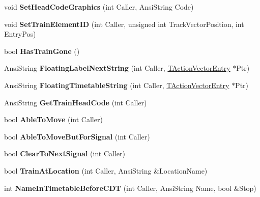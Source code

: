 \begin{DoxyCompactItemize}
void {\bfseries Set\+Head\+Code\+Graphics} (int Caller, Ansi\+String Code)
\item 
\mbox{\label{class_t_train_a0e0ab54415645b04cbdeadd829d27898}} 
void {\bfseries Set\+Train\+Element\+ID} (int Caller, unsigned int Track\+Vector\+Position, int Entry\+Pos)
\item 
\mbox{\label{class_t_train_af95a34f2334cb991841c24997d445ae3}} 
bool {\bfseries Has\+Train\+Gone} ()
\item 
\mbox{\label{class_t_train_a221da69cd80d206a06f840f4cd463cf9}} 
Ansi\+String {\bfseries Floating\+Label\+Next\+String} (int Caller, \mbox{\hyperlink{class_t_action_vector_entry}{T\+Action\+Vector\+Entry}} $\ast$Ptr)
\item 
\mbox{\label{class_t_train_a81bf61b47a2867f0c6901b1ea6f47177}} 
Ansi\+String {\bfseries Floating\+Timetable\+String} (int Caller, \mbox{\hyperlink{class_t_action_vector_entry}{T\+Action\+Vector\+Entry}} $\ast$Ptr)
\item 
\mbox{\label{class_t_train_a63b0884e315178879369c82ee7fd2cb8}} 
Ansi\+String {\bfseries Get\+Train\+Head\+Code} (int Caller)
\item 
\mbox{\label{class_t_train_a659e6bf818f0cfac38728d4748408ee6}} 
bool {\bfseries Able\+To\+Move} (int Caller)
\item 
\mbox{\label{class_t_train_ab4f992b2aeb186f8d23879d9405296a3}} 
bool {\bfseries Able\+To\+Move\+But\+For\+Signal} (int Caller)
\item 
\mbox{\label{class_t_train_aeed1f50d8a4f76d7d77991d276758570}} 
bool {\bfseries Clear\+To\+Next\+Signal} (int Caller)
\item 
\mbox{\label{class_t_train_a935bb43db57a3f2b635be9dfc6a7988b}} 
bool {\bfseries Train\+At\+Location} (int Caller, Ansi\+String \&Location\+Name)
\item 
\mbox{\label{class_t_train_a7a54125a3a5052cb25e17014075a686b}} 
int {\bfseries Name\+In\+Timetable\+Before\+C\+DT} (int Caller, Ansi\+String Name, bool \&Stop)

\end{DoxyCompactItemize}
